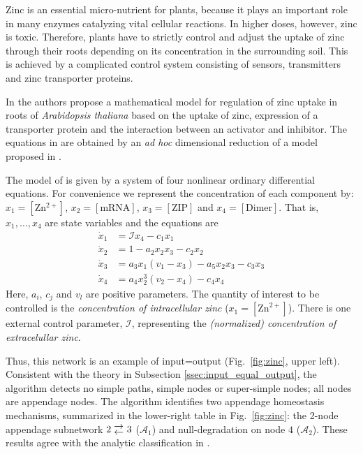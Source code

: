 \documentclass[pdflatex,sn-basic,Numbered]{sn-jnl}
\renewcommand{\AA}{{\mathcal A}}
\newcommand{\biarrow}{\;\smash{{}^{\displaystyle \rightarrow}_{\displaystyle\leftarrow}}\;}
\theoremstyle{thmstyleone}%
\numberwithin{equation}{section}
\begin{document}
Zinc is an essential micro-nutrient for plants, because it plays an important role in many enzymes catalyzing vital cellular reactions. 
In higher doses, however, zinc is toxic. 
Therefore, plants have to strictly control and adjust the uptake of zinc through their roots depending on its concentration in the surrounding soil.
This is achieved by a complicated control system consisting of sensors, transmitters and zinc transporter proteins.

In \cite{claus2015} the authors propose a mathematical model for regulation of zinc uptake in roots of \emph{Arabidopsis thaliana} based on the uptake of zinc, expression of a transporter protein and the interaction between an activator and inhibitor.
The equations in \cite{claus2015} are obtained by an \emph{ad hoc} dimensional reduction of a model proposed in \cite{claus2012}.

The model of \cite{claus2015} is given by a system of four nonlinear ordinary differential equations.
For convenience we represent the concentration of each component by: $x_1=[\mathrm{Zn^{2+}}]$, $x_2=[\mathrm{mRNA}]$, $x_3=[\mathrm{ZIP}]$ and $x_4=[\mathrm{Dimer}]$.
That is, $x_1,\ldots,x_4$ are state variables and the equations are
\begin{equation} \label{EQ:ZINC}
\begin{aligned}
\dot{x}_1 & = \mathcal{I}x_4  - c_1 x_1 \\
\dot{x}_2 & = 1 - a_2 x_2 x_3  - c_2 x_2\\
\dot{x}_3 & = a_3 x_1 (v_1 - x_3) -  a_5 x_2 x_3  
- c_3 x_3 \\
\dot{x}_4 & = a_4 x_2^3 (v_2 - x_4) - c_4 x_4 
\end{aligned}
\end{equation}
Here, $a_i$, $c_j$  and $v_l$ are positive parameters.
The quantity of interest to be controlled is the \emph{concentration of intracellular zinc} ($x_1=[\mathrm{Zn}^{2+}]$).
There is one external control parameter, $\mathcal{I}$, representing the \emph{(normalized) concentration of extracelullar zinc}.

\vspace{5mm}

Thus, this network is an example of input=output (Fig.~\ref{fig:zinc}, upper left). Consistent with the theory in Subsection \ref{ssec:input_equal_output}, the algorithm detects no simple paths, simple nodes or super-simple nodes; all nodes are appendage nodes. The algorithm identifies two appendage homeostasis mechanisms, summarized in the lower-right table in Fig.~\ref{fig:zinc}: the 2-node appendage subnetwork $2 \biarrow 3$ ($\AA_1$) and null-degradation on node $4$ ($\AA_2$). These results agree with the analytic classification in \cite{antoneli2025a}.
\end{document}
